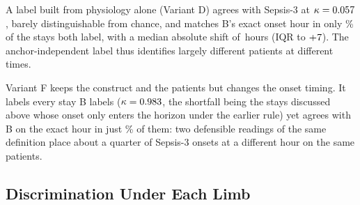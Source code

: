 A label built from physiology alone (Variant D) agrees with Sepsis-3 at $\kappa = 0.057$, barely distinguishable from
chance, and matches B's exact onset hour in only \pcPctExactMatchD\% of the
stays both label, with a median absolute shift of \pcMedianAbsShiftHD\,hours
(IQR \pcIqrShiftLoHD{} to $+7$). The anchor-independent label
thus identifies largely different patients at different times.

Variant F keeps the construct and the patients but changes the onset timing.
It labels every stay B labels ($\kappa = 0.983$, the
shortfall being the \pcFNExtraInHorizon{} stays discussed above whose onset only
enters the horizon under the earlier rule) yet agrees with B on the exact hour
in just \pcPctExactMatchF\% of them: two defensible readings of the same
definition place about a quarter of Sepsis-3 onsets at a different hour on the
same patients.

\subsection{Discrimination Under Each Limb}

